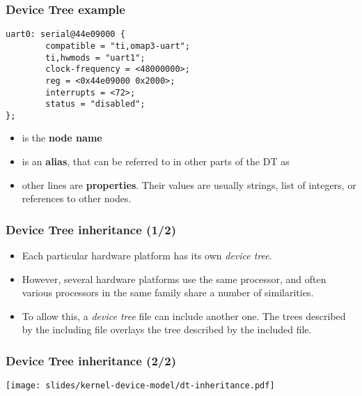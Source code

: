 \begin{frame}[fragile]
  \frametitle{Device Tree example}
  \begin{block}{}
  \small
\begin{verbatim}
uart0: serial@44e09000 {
        compatible = "ti,omap3-uart";
        ti,hwmods = "uart1";
        clock-frequency = <48000000>;
        reg = <0x44e09000 0x2000>;
        interrupts = <72>;
        status = "disabled";
};
  \end{verbatim}
  \end{block}
  \normalsize
  \begin{itemize}
  \item {} is the {\bf node name}
  \item {} is an {\bf alias}, that can be referred to in other
    parts of the DT as 
  \item other lines are {\bf properties}. Their values are usually
    strings, list of integers, or references to other nodes.
  \end{itemize}
\end{frame}

\begin{frame}
  \frametitle{Device Tree inheritance (1/2)}
  \begin{itemize}
  \item Each particular hardware platform has its own {\em device tree}.
  \item However, several hardware platforms use the same processor,
    and often various processors in the same family share a number of
    similarities.
  \item To allow this, a {\em device tree} file can include another
    one. The trees described by the including file overlays the tree
    described by the included file.
  \end{itemize}
\end{frame}

\begin{frame}
  \frametitle{Device Tree inheritance (2/2)}
  \begin{center}
    \texttt{[image: slides/kernel-device-model/dt-inheritance.pdf]}
  \end{center}
\end{frame}

